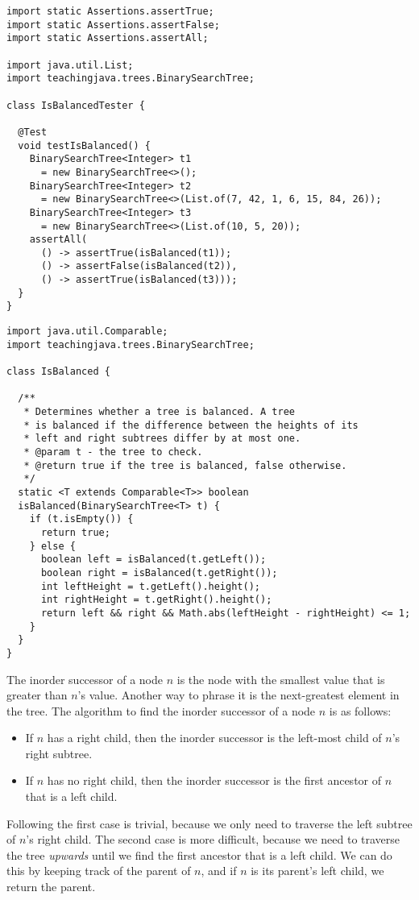 \begin{lstlisting}[language=MyJava]
import static Assertions.assertTrue;
import static Assertions.assertFalse;
import static Assertions.assertAll;

import java.util.List;
import teachingjava.trees.BinarySearchTree;

class IsBalancedTester {

  @Test
  void testIsBalanced() {
    BinarySearchTree<Integer> t1 
      = new BinarySearchTree<>();
    BinarySearchTree<Integer> t2 
      = new BinarySearchTree<>(List.of(7, 42, 1, 6, 15, 84, 26));
    BinarySearchTree<Integer> t3 
      = new BinarySearchTree<>(List.of(10, 5, 20));
    assertAll(
      () -> assertTrue(isBalanced(t1));
      () -> assertFalse(isBalanced(t2)),
      () -> assertTrue(isBalanced(t3)));
  }
}
\end{lstlisting}

\enlargethispage{6\baselineskip}
\begin{lstlisting}[language=MyJava]
import java.util.Comparable;
import teachingjava.trees.BinarySearchTree;

class IsBalanced {

  /**
   * Determines whether a tree is balanced. A tree 
   * is balanced if the difference between the heights of its 
   * left and right subtrees differ by at most one.
   * @param t - the tree to check.
   * @return true if the tree is balanced, false otherwise.
   */
  static <T extends Comparable<T>> boolean 
  isBalanced(BinarySearchTree<T> t) {
    if (t.isEmpty()) {
      return true;
    } else {
      boolean left = isBalanced(t.getLeft());
      boolean right = isBalanced(t.getRight());
      int leftHeight = t.getLeft().height();
      int rightHeight = t.getRight().height();
      return left && right && Math.abs(leftHeight - rightHeight) <= 1;
    }
  }
}
\end{lstlisting}

The inorder successor of a node $n$ is the node with the smallest value that is greater than $n$'s value. 
Another way to phrase it is the next-greatest element in the tree.
The algorithm to find the inorder successor of a node $n$ is as follows:
\begin{itemize}
  \item If $n$ has a right child, then the inorder successor is the left-most child of $n$'s right subtree.
  \item If $n$ has no right child, then the inorder successor is the first ancestor of $n$ that is a left child.
\end{itemize}
Following the first case is trivial, because we only need to traverse the left subtree of $n$'s right child. 
The second case is more difficult, because we need to traverse the tree \emph{upwards} until we find the first ancestor that is a left child. 
We can do this by keeping track of the parent of $n$, and if $n$ is its parent's left child, we return the parent.


